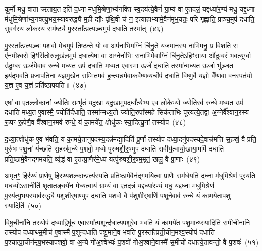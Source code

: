 कू॒र्मो मधु॒ वाता॑ ऋताय॒त इति॑ द॒ध्ना म॑धुमि॒श्रेणा॒भ्य॑नक्ति स्व॒दय॑त्ये॒वैनं॑ ग्रा॒म्यं वा ए॒तदन्नं॒ यद्दध्या॑र॒ण्यं मधु॒ यद्द॒ध्ना म॑धुमि॒श्रेणा᳚भ्य॒नक्त्यु॒भय॒स्याव॑रुद्ध्यै म॒ही द्यौः पृ॑थि॒वी च॑ न॒ इत्या॑हा॒भ्यामे॒वैन॑मुभ॒यतः॒ परि॑ गृह्णाति॒ प्राञ्च॒मुप॑ दधाति॒ सुव॒र्गस्य॑ लो॒कस्य॒ सम॑ष्ट्यै पु॒रस्ता᳚त्प्र॒त्यञ्च॒मुप॑ दधाति॒ तस्मा᳚त्~(४६)

पु॒रस्ता᳚त्प्र॒त्यञ्चः॑ प॒शवो॒ मेध॒मुप॑ तिष्ठन्ते॒ यो वा अप॑नाभिम॒ग्निं चि॑नु॒ते यज॑मानस्य॒ नाभि॒मनु॒ प्र वि॑शति॒ स ए॑नमीश्व॒रो हिꣳसि॑तोरु॒लूख॑ल॒मुप॑ दधात्ये॒षा वा अ॒ग्नेर्नाभिः॒ सना॑भिमे॒वाग्निं चि॑नु॒ते\-ऽहिꣳ॑साया॒ औ॑दुम्बरं भव॒त्यूर्ग्वा उ॑दु॒म्बर॒ ऊर्ज॑मे॒वाव॑ रुन्धे मध्य॒त उप॑ दधाति मध्य॒त ए॒वास्मा॒ ऊर्जं॑ दधाति॒ तस्मा᳚न्मध्य॒त ऊ॒र्जा भु॑ञ्जत॒ इय॑द्भवति प्र॒जा\-प॑तिना यज्ञमु॒खेन॒ सम्मि॑त॒मव॑ ह॒न्त्यन्न॑मे॒वाक॑र्वैष्ण॒व्यर्चोप॑ दधाति॒ विष्णु॒र्वै य॒ज्ञो वै᳚ष्ण॒वा वन॒स्पत॑यो य॒ज्ञ ए॒व य॒ज्ञं प्रति॑\-ष्ठापयति॥~(४७)

{\anuvakamend[{ए॒ष वै प॒शुर्यम॑सर्पदे॒ष यत्तस्मा॒त्तस्मा᳚थ्स॒प्तविꣳ॑शतिश्च}]}%

ए॒षां वा ए॒तल्लो॒कानां॒ ज्योतिः॒ सम्भृ॑तं॒ यदु॒खा यदु॒खामु॑प॒दधा᳚त्ये॒भ्य ए॒व लो॒केभ्यो॒ ज्योति॒रव॑ रुन्धे मध्य॒त उप॑ दधाति मध्य॒त ए॒वास्मै॒ ज्योति॑र्दधाति॒ तस्मा᳚न्मध्य॒तो ज्योति॒रुपा᳚स्महे॒ सिक॑ताभिः पूरयत्ये॒तद्वा अ॒ग्नेर्वै᳚श्वान॒रस्य॑ रू॒पꣳ रू॒पेणै॒व वै᳚श्वान॒रमव॑ रुन्धे॒ यं का॒मये॑त॒ क्षोधु॑कः स्या॒दित्यू॒नां तस्योप॑~(४८)

द॒ध्या॒त्क्षोधु॑क ए॒व भ॑वति॒ यं का॒मये॒तानु॑पदस्य॒दन्न॑मद्या॒दिति॑ पू॒र्णां तस्योप॑ दध्या॒दनु॑पदस्यदे॒वान्न॑मत्ति स॒हस्रं॒ वै प्रति॒ पुरु॑षः पशू॒नां य॑च्छति स॒हस्र॑म॒न्ये प॒शवो॒ मध्ये॑ पुरुषशी॒र्॒\mbox{}षमुप॑ दधाति सवीर्य॒त्वायो॒खाया॒मपि॑ दधाति प्रति॒ष्ठामे॒वैन॑द्गमयति॒ व्यृ॑द्धं॒ वा ए॒तत्प्रा॒णैर॑मे॒ध्यं यत्पु॑रुषशी॒र्॒\mbox{}षम॒मृतं॒ खलु॒ वै प्रा॒णाः~(४९)

अ॒मृत॒ꣳ॒ हिर॑ण्यं प्रा॒णेषु॑ हिरण्यश॒ल्कान्प्रत्य॑स्यति प्रति॒ष्ठामे॒वैन॑द्गमयि॒त्वा प्रा॒णैः सम॑र्धयति द॒ध्ना म॑धुमि॒श्रेण॑ पूरयति मध॒व्यो॑\-ऽसा॒नीति॑ शृतात॒ङ्क्ये॑न मेध्य॒त्वाय॑ ग्रा॒म्यं वा ए॒तदन्नं॒ यद्दध्या॑र॒ण्यं मधु॒ यद्द॒ध्ना म॑धुमि॒श्रेण॑ पू॒रय॑त्यु॒भय॒स्याव॑रुद्ध्यै पशुशी॒र्॒\mbox{}षाण्युप॑ दधाति प॒शवो॒ वै प॑शुशी॒र्॒\mbox{}षाणि॑ प॒शूने॒वाव॑ रुन्धे॒ यं का॒मये॑ताप॒शुः स्या॒दिति॑~(५०)

वि॒षू॒चीना॑नि॒ तस्योप॑ दध्या॒द्विषू॑च ए॒वास्मा᳚त्प॒शून्द॑धात्यप॒शुरे॒व भ॑वति॒ यं का॒मये॑त पशु॒मान्थ्स्या॒दिति॑ समी॒चीना॑नि॒ तस्योप॑ दध्याथ्स॒मीच॑ ए॒वास्मै॑ प॒शून्द॑धाति पशु॒माने॒व भ॑वति पु॒रस्ता᳚त्प्रती॒चीन॒मश्व॒स्योप॑ दधाति प॒श्चात्प्रा॒चीन॑मृष॒भस्याप॑शवो॒ वा अ॒न्ये गो॑अ॒श्वेभ्यः॑ प॒शवो॑ गोअ॒श्वाने॒वास्मै॑ स॒मीचो॑ दधात्ये॒ताव॑न्तो॒ वै प॒शवः॑~(५१)

